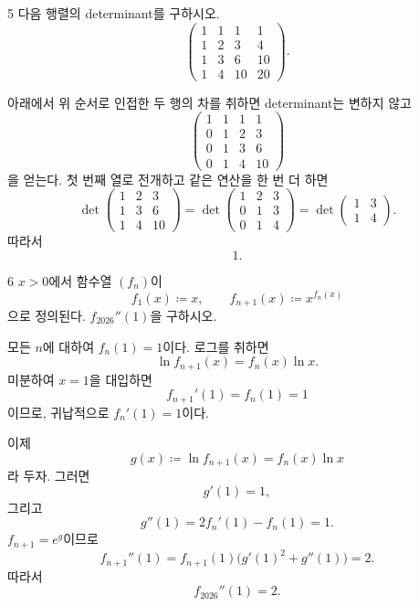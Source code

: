 \begin{problem}{5}
다음 행렬의 determinant를 구하시오.
\[
    \begin{pmatrix}
        1&1&1&1\\
        1&2&3&4\\
        1&3&6&10\\
        1&4&10&20
    \end{pmatrix}.
\]
\end{problem}

\begin{solution}
아래에서 위 순서로 인접한 두 행의 차를 취하면 determinant는 변하지 않고
\[
    \begin{pmatrix}
        1&1&1&1\\
        0&1&2&3\\
        0&1&3&6\\
        0&1&4&10
    \end{pmatrix}
\]
을 얻는다. 첫 번째 열로 전개하고 같은 연산을 한 번 더 하면
\[
    \det
    \begin{pmatrix}
        1&2&3\\
        1&3&6\\
        1&4&10
    \end{pmatrix}
    =
    \det
    \begin{pmatrix}
        1&2&3\\
        0&1&3\\
        0&1&4
    \end{pmatrix}
    =
    \det
    \begin{pmatrix}
        1&3\\
        1&4
    \end{pmatrix}.
\]
따라서
\[
    \boxed{1}.
\]
\end{solution}

\begin{problem}{6}
$x>0$에서 함수열 $(f_n)$이
\[
    f_1(x)\coloneqq x,
    \qquad
    f_{n+1}(x)\coloneqq x^{f_n(x)}
\]
으로 정의된다. $f_{2026}''(1)$을 구하시오.
\end{problem}

\begin{solution}
모든 $n$에 대하여 $f_n(1)=1$이다. 로그를 취하면
\[
    \ln f_{n+1}(x)=f_n(x)\ln x.
\]
미분하여 $x=1$을 대입하면
\[
    f_{n+1}'(1)=f_n(1)=1
\]
이므로, 귀납적으로 $f_n'(1)=1$이다.

이제
\[
    g(x)\coloneqq \ln f_{n+1}(x)=f_n(x)\ln x
\]
라 두자. 그러면
\[
    g'(1)=1,
\]
그리고
\[
    g''(1)
    =
    2f_n'(1)-f_n(1)
    =1.
\]
$f_{n+1}=e^g$이므로
\[
    f_{n+1}''(1)
    =
    f_{n+1}(1)\bigl(g'(1)^2+g''(1)\bigr)
    =2.
\]
따라서
\[
    \boxed{f_{2026}''(1)=2}.
\]
\end{solution}

